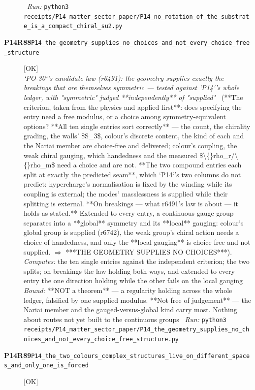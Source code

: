 \begin{description}
\ \emph{Run:} \texttt{python3 receipts/P14\_matter\_sector\_paper/P14\_no\_rotation\_of\_the\_substrate\_is\_a\_compact\_chiral\_su2.py}
\item[\rcptlabel{P14_the_geometry_supplies_no_choices_and_not_every_choice_free_structure}{P14R88}\textbf{P14R88}\quad\texttt{P14\_the\_geometry\_supplies\_no\_choices\_and\_not\_every\_choice\_free\_structure}]\hfill\textsf{[OK]}\\
\textit{`PO-30`'s candidate law (r6491): the geometry supplies exactly the breakings that are themselves symmetric --- tested against `P14`'s whole ledger, with "symmetric" judged **independently** of "supplied"} \ (**The criterion, taken from the physics and applied first**: does specifying the entry need a free modulus, or a choice among symmetry-equivalent options?  **All ten single entries sort correctly** --- the count, the chirality grading, the walls' \$S\_3\$, colour's discrete content, the kind of each and the Nariai member are choice-free and delivered; colour's coupling, the weak chiral gauging, which handedness and the measured \$\textbackslash\{\}rho\_r/\textbackslash\{\}rho\_m\$ need a choice and are not.  **The two compound entries each split at exactly the predicted seam**, which `P14`'s two columns do not predict: hypercharge's normalisation is fixed by the winding while its coupling is external; the modes' masslessness is supplied while their splitting is external.  **On breakings --- what r6491's law is about --- it holds as stated.** Extended to every entry, a continuous gauge group separates into a **global** symmetry and its **local** gauging: colour's global group is supplied (r6742), the weak group's chiral action needs a choice of handedness, and only the **local gauging** is choice-free and not supplied. \ensuremath{\Rightarrow} ***THE GEOMETRY SUPPLIES NO CHOICES***). 
\emph{Computes:} the ten single entries against the independent criterion; the two splits; on breakings the law holding both ways, and extended to every entry the one direction holding while the other fails on the local gauging
 \emph{Bound:}  **NOT a theorem** --- a regularity holding across the whole ledger, falsified by one supplied modulus. **Not free of judgement** --- the Nariai member and the gauged-versus-global kind carry most. Nothing about routes not yet built to the continuous groups
\ \emph{Run:} \texttt{python3 receipts/P14\_matter\_sector\_paper/P14\_the\_geometry\_supplies\_no\_choices\_and\_not\_every\_choice\_free\_structure.py}
\item[\rcptlabel{P14_the_two_colours_complex_structures_live_on_different_spaces_and_only_one_is_forced}{P14R89}\textbf{P14R89}\quad\texttt{P14\_the\_two\_colours\_complex\_structures\_live\_on\_different\_spaces\_and\_only\_one\_is\_forced}]\hfill\textsf{[OK]}\\

\end{description}
